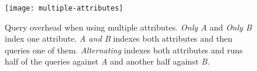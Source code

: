 \begin{figure}[!ht]
	\centering
	\texttt{[image: multiple-attributes]}
	\caption[Query overhead when using multiple attributes]{
		Query overhead when using multiple attributes.
		\emph{Only A} and \emph{Only B} index one attribute.
		\emph{A and B} indexes both attributes and then queries one of them.
		\emph{Alternating} indexes both attributes and runs half of the queries against \emph{A} and another half against \emph{B}.
	}%
	\label{figure:attributes}
\end{figure}
